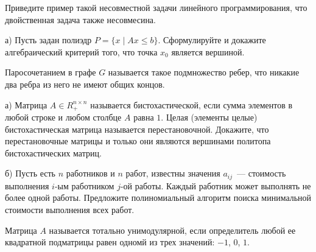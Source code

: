 \setcounter{curtask}{13}




\begin{task}
    Приведите пример такой несовместной задачи линейного программирования, что
    двойственная задача также несовмесина.
\end{task}


\begin{task}
    а) Пусть задан полиэдр $P = \{x \mid Ax \le b\}$. Сформулируйте и докажите
    алгебраический критерий того, что точка $x_0$ является вершиной.
\end{task}


Паросочетанием в графе $G$ называется такое подмножество ребер, что никакие два
ребра из него не имеют общих концов.

\begin{task}
	а) Матрица $A \in R_{+}^{n \times n}$ называется бистохастической, если сумма
    элементов в любой строке и любом столбце $A$ равна $1$. Целая (элементы целые)
    бистохастическая матрица называется перестановочной. Докажите, что
    перестановочные матрицы и только они являются вершинами политопа бистохастических
    матриц.

    б) Пусть есть $n$ работников и $n$ работ, известны значения $a_{ij}$~---
    стоимость выполнения $i$-ым работником $j$-ой работы. Каждый работник может
    выполнять не более одной работы. Предложите полиномиальный алгоритм поиска
    минимальной стоимости выполнения всех работ. 
\end{task}



Матрица $A$ называется тотально унимодулярной, если определитель любой ее квадратной
подматрицы равен одномй из трех значений: $-1$, $0$, $1$.